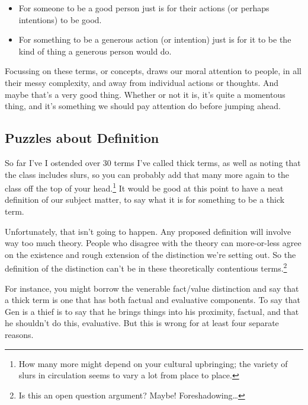 \documentclass[
]{article}
\providecommand{\tightlist}{%
  \setlength{\itemsep}{0pt}\setlength{\parskip}{0pt}}
\begin{document}
\begin{itemize}
\tightlist
\item
  For someone to be a good person just is for their actions (or perhaps
  intentions) to be good.
\item
  For something to be a generous action (or intention) just is for it to
  be the kind of thing a generous person would do.
\end{itemize}

Focussing on these terms, or concepts, draws our moral attention to
people, in all their messy complexity, and away from individual actions
or thoughts. And maybe that's a very good thing. Whether or not it is,
it's quite a momentous thing, and it's something we should pay attention
do before jumping ahead.

\hypertarget{puzzles-about-definition}{%
\subsection{Puzzles about Definition}\label{puzzles-about-definition}}

So far I've I ostended over 30 terms I've called thick terms, as well as
noting that the class includes slurs, so you can probably add that many
more again to the class off the top of your head.\footnote{How many more
  might depend on your cultural upbringing; the variety of slurs in
  circulation seems to vary a lot from place to place.} It would be good
at this point to have a neat definition of our subject matter, to say
what it is for something to be a thick term.

Unfortunately, that isn't going to happen. Any proposed definition will
involve way too much theory. People who disagree with the theory can
more-or-less agree on the existence and rough extension of the
distinction we're setting out. So the definition of the distinction
can't be in these theoretically contentious terms.\footnote{Is this an
  open question argument? Maybe! Foreshadowing\ldots{}}

For instance, you might borrow the venerable fact/value distinction and
say that a thick term is one that has both factual and evaluative
components. To say that Gen is a thief is to say that he brings things
into his proximity, factual, and that he shouldn't do this, evaluative.
But this is wrong for at least four separate reasons.
\end{document}
